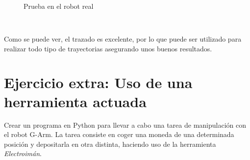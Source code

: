 \begin{figure} [ht!]
    \centering  
    \hspace{1cm}
    \caption{Prueba en el robot real}
    \label{fig:real_draw}
\end{figure}\ 

Como se puede ver, el trazado es excelente, por lo que puede ser utilizado para realizar todo tipo de trayectorias asegurando unos buenos resultados.


\newpage
\section*{Ejercicio extra: Uso de una herramienta actuada}
\noindent Crear un programa en Python para llevar a cabo una tarea de manipulación con el robot G-Arm. La tarea consiste en coger una moneda de una determinada posición y 
depositarla en otra distinta, haciendo uso de la herramienta \textit{Electroimán}.

